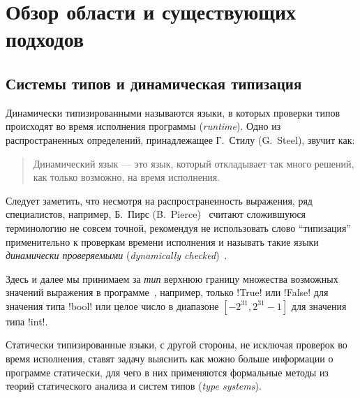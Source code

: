 \chapter{Обзор области и существующих подходов}

\section{Системы типов и динамическая типизация}

Динамически типизированными называются языки, в которых проверки типов
происходят во время исполнения программы (\emph{runtime}). Одно из
распространенных определений, принадлежащее Г.~Стилу (G.~Steel), звучит как:

\begin{quote}

  Динамический язык --- это язык, который откладывает так много решений, как
  только возможно, на время исполнения.
\end{quote}

Следует заметить, что несмотря на распространенность выражения, ряд
специалистов, например, Б.~Пирс (B.~Pierce)~\cite{Pierce2002} считают
сложившуюся терминологию не совсем точной, рекомендуя не использовать слово
``типизация'' применительно к проверкам времени исполнения и называть такие
языки \emph{динамически проверяемыми} (\emph{dynamically
  checked})~\cite{Cardelli2004}.


Здесь и далее мы принимаем за \emph{тип} верхнюю границу множества возможных
значений выражения в программе~\cite{Cardelli2004}, например, только !True! или
!False! для значения типа !bool! или целое число в диапазоне 
$[-2^{31}, 2^{31}-1]$ для значения типа !int!.

Статически типизированные языки, с другой стороны, не исключая проверок во время
исполнения, ставят задачу выяснить как можно больше информации о программе
статически, для чего в них применяются формальные методы из теорий статического
анализа и систем типов (\emph{type systems}). 

